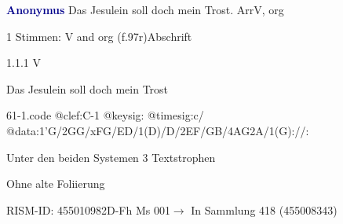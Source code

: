 \documentclass[twocolumn]{book}
\begin{document}
\par \vspace{7pt} \textcolor{darkblue}{\textbf{Anonymus  }}\hfillplus{\textbf{[61]}}\newline Das Jesulein soll doch mein Trost. Arr\newline V, org
\par \begin{itshape}\end{itshape} 
\par \textcolor{darkblue}{}  1 Stimmen: V and org  (f.97r)\newline Abschrift
\par 1.1.1  V\newline \begin{footnotesize} Das Jesulein soll doch mein Trost \end{footnotesize}  
\begin{filecontents*}{61-1.code}
@clef:C-1
@keysig:
@timesig:c/
@data:1'G/2GG/xFG/ED/1(D)/D/2EF/GB/4AG2A/1(G)://:
\end{filecontents*}
\newline
%
\par Unter den beiden Systemen 3 Textstrophen
\par Ohne alte Foliierung
\par RISM-ID: 455010982\newline D-Fh  Ms 001\newline $\rightarrow$ In Sammlung 418 (455008343)
      
\end{document}
